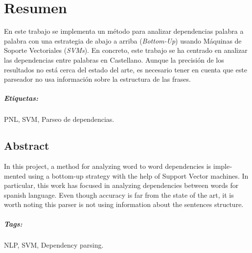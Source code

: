 \begingroup
\let\clearpage\relax
\let\cleardoublepage\relax
\let\cleardoublepage\relax

\chapter*{Resumen}
En este trabajo se implementa un método para analizar dependencias
palabra a palabra con una estrategia de abajo a arriba
(\textit{Bottom-Up}) usando Máquinas de Soporte Vectoriales
(\textit{SVMs}). En concreto, este trabajo se ha centrado en analizar
las dependencias entre palabras en Castellano. Aunque la precisión de
los resultados no está cerca del estado del arte, es necesario tener
en cuenta que este parseador no usa información sobre la estructura de
las frases.

\paragraph{Etiquetas:} PNL, SVM, Parseo de dependencias.

\vfill

\begin{otherlanguage}{american}
  \chapter*{Abstract}
  In this project, a method for analyzing word to word dependencies is
  implemented using a bottom-up strategy with the help of Support Vector
  machines. In particular, this work has focused in analyzing
  dependencies between words for spanish language. Even though accuracy
  is far from the state of the art, it is worth noting this parser is
  not using information about the sentences structure.
  \paragraph{Tags:} NLP, SVM, Dependency parsing.
\end{otherlanguage}

\endgroup			

\vfill